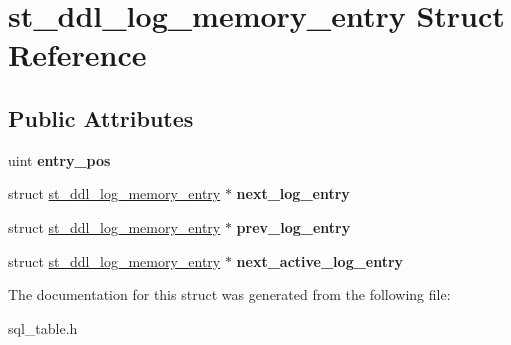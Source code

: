 \hypertarget{structst__ddl__log__memory__entry}{}\section{st\+\_\+ddl\+\_\+log\+\_\+memory\+\_\+entry Struct Reference}
\label{structst__ddl__log__memory__entry}
\subsection*{Public Attributes}
\begin{DoxyCompactItemize}
\item 
\mbox{\label{structst__ddl__log__memory__entry_a0c71895504d2059fa798e87ccc3e81b0}} 
uint {\bfseries entry\+\_\+pos}
\item 
\mbox{\label{structst__ddl__log__memory__entry_af5c3feb8e2f59e8374f9a6d866ada3c3}} 
struct \mbox{\hyperlink{structst__ddl__log__memory__entry}{st\+\_\+ddl\+\_\+log\+\_\+memory\+\_\+entry}} $\ast$ {\bfseries next\+\_\+log\+\_\+entry}
\item 
\mbox{\label{structst__ddl__log__memory__entry_ab866bdb4404f15915d462fb6fd4f2d39}} 
struct \mbox{\hyperlink{structst__ddl__log__memory__entry}{st\+\_\+ddl\+\_\+log\+\_\+memory\+\_\+entry}} $\ast$ {\bfseries prev\+\_\+log\+\_\+entry}
\item 
\mbox{\label{structst__ddl__log__memory__entry_ab57819e2cc2864cc11072a691fe4942b}} 
struct \mbox{\hyperlink{structst__ddl__log__memory__entry}{st\+\_\+ddl\+\_\+log\+\_\+memory\+\_\+entry}} $\ast$ {\bfseries next\+\_\+active\+\_\+log\+\_\+entry}
\end{DoxyCompactItemize}


The documentation for this struct was generated from the following file\+:\begin{DoxyCompactItemize}
\item 
sql\+\_\+table.\+h\end{DoxyCompactItemize}
